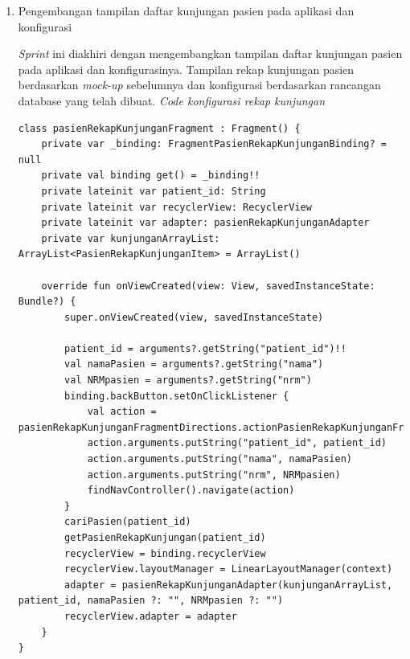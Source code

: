 \begin{enumerate}
\item Pengembangan tampilan daftar kunjungan pasien pada aplikasi dan konfigurasi

\textit{Sprint} ini diakhiri dengan mengembangkan tampilan daftar kunjungan pasien pada aplikasi dan konfigurasinya. Tampilan rekap kunjungan pasien berdasarkan \textit{mock-up} sebelumnya dan konfigurasi berdasarkan rancangan database yang telah dibuat.
\textit{Code konfigurasi rekap kunjungan}
\begin{lstlisting}
class pasienRekapKunjunganFragment : Fragment() {
    private var _binding: FragmentPasienRekapKunjunganBinding? = null
    private val binding get() = _binding!!
    private lateinit var patient_id: String
    private lateinit var recyclerView: RecyclerView
    private lateinit var adapter: pasienRekapKunjunganAdapter
    private var kunjunganArrayList: ArrayList<PasienRekapKunjunganItem> = ArrayList()

    override fun onViewCreated(view: View, savedInstanceState: Bundle?) {
        super.onViewCreated(view, savedInstanceState)

        patient_id = arguments?.getString("patient_id")!!
        val namaPasien = arguments?.getString("nama")
        val NRMpasien = arguments?.getString("nrm")
        binding.backButton.setOnClickListener {
            val action = pasienRekapKunjunganFragmentDirections.actionPasienRekapKunjunganFragmentToHomePasienFragment()
            action.arguments.putString("patient_id", patient_id)
            action.arguments.putString("nama", namaPasien)
            action.arguments.putString("nrm", NRMpasien)
            findNavController().navigate(action)
        }
        cariPasien(patient_id)
        getPasienRekapKunjungan(patient_id)
        recyclerView = binding.recyclerView
        recyclerView.layoutManager = LinearLayoutManager(context)
        adapter = pasienRekapKunjunganAdapter(kunjunganArrayList, patient_id, namaPasien ?: "", NRMpasien ?: "")
        recyclerView.adapter = adapter
    }
}
\end{lstlisting}
\end{enumerate}

